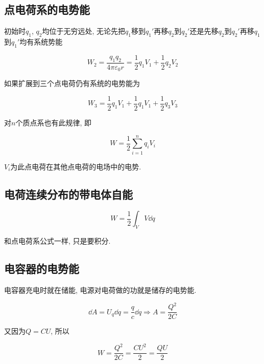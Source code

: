 \subsection{点电荷系的电势能} \label{7.5}

初始时$q_1$, $q_2$均位于无穷远处, 无论先把$q_1$移到$q_1'$再移$q_2$到$q_2'$还是先移$q_2$到$q_2'$再移$q_1$到$q_1'$均有系统势能

\begin{equation}
	W_2 = \dfrac{q_1 q_2}{4 \pi \varepsilon_0 r} = \dfrac{1}{2}q_1 V_1 + \dfrac{1}{2}q_2 V_2 \label{C7-eq22}
\end{equation}

如果扩展到三个点电荷仍有系统的电势能为

\begin{equation}
	W_3 = \dfrac{1}{2}q_1 V_1 + \dfrac{1}{2}q_1 V_1 + \dfrac{1}{2}q_3 V_3
\end{equation}

对$n$个质点系也有此规律, 即

\begin{equation}
	W = \dfrac{1}{2} \sum\limits_{i=1}^{n}{q_i V_i} \label{C7-eq23}
\end{equation}

$V_i$为此点电荷在其他点电荷的电场中的电势. 

\subsection{电荷连续分布的带电体自能}

\begin{equation}
	W = \dfrac{1}{2} \int_{V} V \dd{q} \label{C7-eq24}
\end{equation}

和点电荷系公式一样, 只是要积分. 

\subsection{电容器的电势能}

电容器充电时就在储能, 电源对电荷做的功就是储存的电势能. 

\begin{equation}
	\dd{A} = U_q \dd{q} = \dfrac{q}{c} \dd{q} \Rightarrow A=\frac{Q^2}{2C} \label{C7-eq25}
\end{equation}

又因为$Q = CU$, 所以

\begin{equation}
	W = \dfrac{Q^2}{2C} = \dfrac{C U^2}{2} = \dfrac{QU}{2} \label{C7-eq26}
\end{equation}

